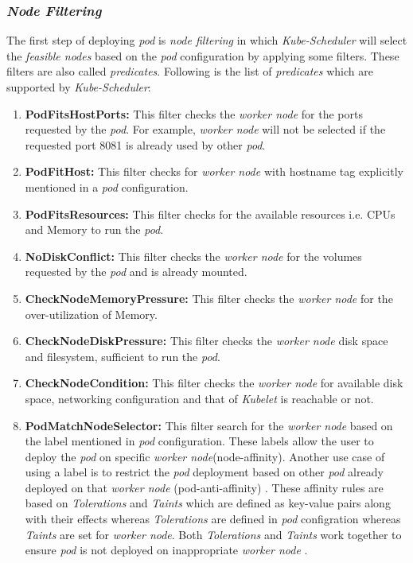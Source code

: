 \subsubsection{\emph{Node Filtering}}
\label{sec:node-filter}
The first step of deploying \emph{pod} is \emph{node filtering} in which \emph{Kube-Scheduler} will select the \emph{feasible nodes} based on the \emph{pod} configuration by applying some filters\cite{Santos2019}. These filters are also called \emph{predicates}. Following is the list of \emph{predicates} which are supported by \emph{Kube-Scheduler}\cite{k8s}:
\begin{enumerate}
  \item \textbf{PodFitsHostPorts:} This filter checks the \emph{worker node} for the ports requested by the \emph{pod}. For example, \emph{worker node} will not be selected if the requested port 8081 is already used by other \emph{pod}.
  \item \textbf{PodFitHost:} This filter checks for \emph{worker node} with hostname tag explicitly mentioned in a \emph{pod} configuration.
  \item \textbf{PodFitsResources:} This filter checks for the available resources i.e. CPUs and Memory to run the \emph{pod}.
  \item \textbf{NoDiskConflict:} This filter checks the \emph{worker node} for the volumes requested by the \emph{pod} and is already mounted.
  \item \textbf{CheckNodeMemoryPressure:} This filter checks the \emph{worker node} for the over-utilization of Memory.
  \item \textbf{CheckNodeDiskPressure:} This filter checks the \emph{worker node} disk space and filesystem, sufficient to run the \emph{pod}.
  \item \textbf{CheckNodeCondition:} This filter checks the \emph{worker node} for available disk space, networking configuration and that of \emph{Kubelet} is reachable or not.
  \item \textbf{PodMatchNodeSelector:} This filter search for the \emph{worker node} based on the label mentioned in \emph{pod} configuration. These labels allow the user to deploy the \emph{pod} on specific \emph{worker node}(node-affinity)\cite{Santos2019}. Another use case of using a label is to restrict the \emph{pod} deployment based on other \emph{pod} already deployed on that \emph{worker node} (pod-anti-affinity) \cite{Santos2019}. These affinity rules are based on \emph{Tolerations} and \emph{Taints} which are defined as key-value pairs along with their effects whereas \emph{Tolerations} are defined in \emph{pod} configration whereas \emph{Taints} are set for \emph{worker node}\cite{k8s}. Both \emph{Tolerations} and \emph{Taints} work together to ensure \emph{pod} is not deployed on inappropriate \emph{worker node} \cite{k8s}.
\end{enumerate}
